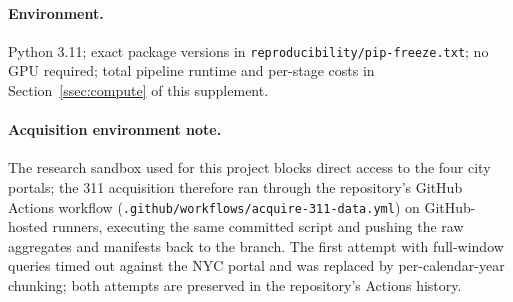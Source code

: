 \paragraph{Environment.} Python 3.11; exact package versions in
\texttt{reproducibility/pip-freeze.txt}; no GPU required; total pipeline
runtime and per-stage costs in Section~\ref{ssec:compute} of this supplement.

\paragraph{Acquisition environment note.} The research sandbox used for
this project blocks direct access to the four city portals; the 311
acquisition therefore ran through the repository's GitHub Actions
workflow (\texttt{.github/workflows/acquire-311-data.yml}) on
GitHub-hosted runners, executing the same committed script and pushing
the raw aggregates and manifests back to the branch. The first attempt
with full-window queries timed out against the NYC portal and was
replaced by per-calendar-year chunking; both attempts are preserved in
the repository's Actions history.
